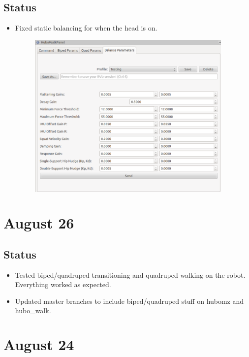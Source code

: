 \documentclass[letterpaper, 10 pt]{report}
\begin{document}
\subsection*{Status}
\begin{itemize}
  \item Fixed static balancing for when the head is on.
  \newline
  \begin{figure}[h]
  \centering
  \includegraphics[width=10.0cm]{resources/static-balance-gains-with-head}
  \end{figure}
\end{itemize}

\section*{August 26}
\subsection*{Status}
\begin{itemize}
\item Tested biped/quadruped transitioning and quadruped walking on the robot. Everything worked as expected.
\item Updated master branches to include biped/quadruped stuff on hubomz and hubo\_walk.
\end{itemize}

\section*{August 24}
\end{document}
